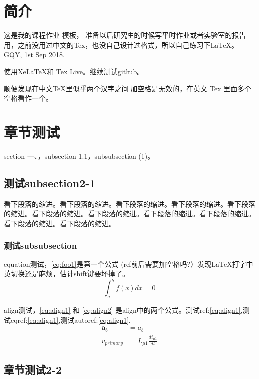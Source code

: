 \documentclass{myreport}
\begin{document}
\thispagestyle{empty}
\makemycover %




\clearpage
\newpage

\section{简介}
这是我的课程作业   模板，    准备以后研究生的时候写平时作业或者实验室的报告用，之前没用过中文的Tex，也没自己设计过格式，所以自己练习下\LaTeX。--GQY, 1st Sep 2018. 

使用XeLaTeX和 Tex Live。继续测试github。

顺便发现在中文TeX里似乎两个汉字之间   加空格是无效的，在英文 Tex 里面多个空格看作一个。


\section{章节测试}
section 一、，subsection 1.1，subsubsection (1)。
\subsection{测试subsection2-1}
看下段落的缩进。看下段落的缩进。看下段落的缩进。看下段落的缩进。看下段落的缩进。看下段落的缩进。看下段落的缩进。看下段落的缩进。看下段落的缩进。看下段落的缩进。看下段落的缩进。
\subsubsection{测试subsubsection}
equation测试，\eqref{eq:foo1}是第一个公式
{\color{red}(ref前后需要加空格吗?）}发现\LaTeX 打字中英切换还是麻烦，估计shift键要坏掉了。
\begin{equation}
\int_a^b f(x)dx = 0 \label{eq:foo1}
\end{equation}

align测试，\eqref{eq:align1} 和 \eqref{eq:align2} 是align中的两个公式。测试ref:\ref{eq:align1},测试eqref:\eqref{eq:align1},测试autoref:\autoref{eq:align1}.
\begin{align}
 \bm{a}_b &= a_b \label{eq:align1}\\
 v_{primary} &= L_{\mu 1}\frac{di_{\mu 1}}{dt} \label{eq:align2} 
\end{align}


\subsection{章节测试2-2}
\end{document}
